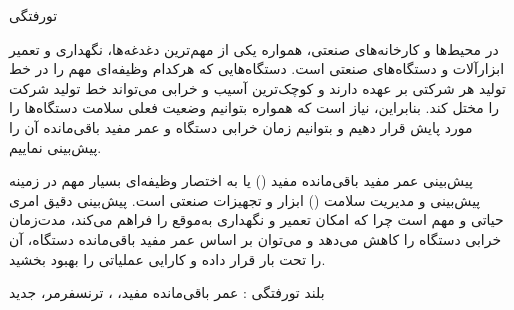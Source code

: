 


‌تورفتگی

در محیط‌ها و کارخانه‌های صنعتی، همواره یکی از مهم‌ترین دغدغه‌ها، نگهداری و تعمیر ابزارآلات و دستگاه‌های صنعتی است. دستگاه‌هایی که هرکدام وظیفه‌ای مهم را در خط تولید هر شرکتی بر عهده دارند و کوچک‌ترین آسیب و خرابی می‌تواند خط تولید شرکت را مختل کند. بنابراین، نیاز است که همواره بتوانیم وضعیت فعلی سلامت دستگاه‌ها را مورد پایش قرار دهیم و بتوانیم زمان خرابی دستگاه و عمر مفید باقی‌مانده آن را پیش‌بینی نماییم.

پیش‌بینی عمر مفید باقی‌مانده مفید () یا به اختصار  وظیفه‌ای بسیار مهم در زمینه پیش‌بینی و مدیریت سلامت () ابزار و تجهیزات صنعتی است. پیش‌بینی دقیق  امری حیاتی و مهم است چرا که امکان تعمیر و نگهداری به‌موقع را فراهم می‌کند، مدت‌زمان خرابی دستگاه را کاهش می‌دهد و می‌توان بر اساس عمر مفید باقی‌مانده دستگاه، آن را تحت بار قرار داده و کارایی عملیاتی را بهبود بخشید.

‌بلند
‌تورفتگی : 
عمر باقی‌مانده مفید، ، ترنسفرمر، 
‌جدید
